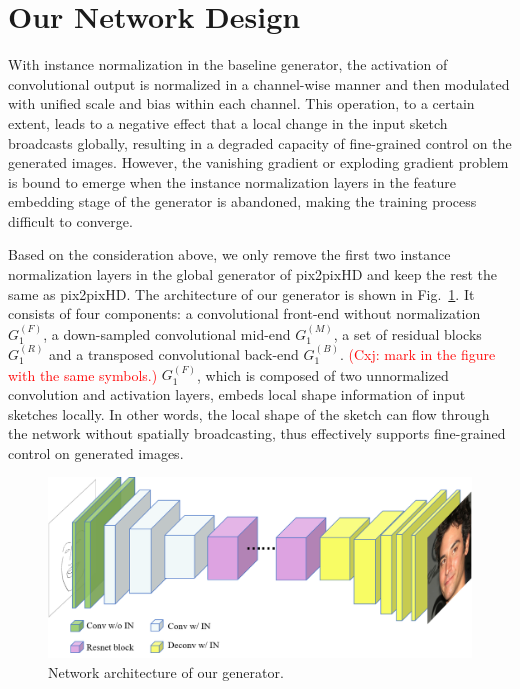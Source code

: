 \documentclass[10pt,twocolumn,letterpaper]{article}
\newcommand{\cxj}[1]{\textcolor{red}{(Cxj: #1)}}
\begin{document}
\section{Our Network Design}\label{sec:network}
%
With instance normalization in the baseline generator, the activation of convolutional output is normalized in a channel-wise manner and then modulated with unified scale and bias within each channel. 
This operation, to a certain extent, leads to a negative effect that a local change in the input sketch broadcasts globally, resulting in a degraded capacity of fine-grained control on the generated images.
However, the vanishing gradient or exploding gradient problem is bound to emerge when the instance normalization layers in the feature embedding stage of the generator is abandoned, making the training process difficult to converge. 
 
Based on the consideration above, we only remove the first two instance normalization layers in the global generator of pix2pixHD and keep the rest the same as pix2pixHD. 
The architecture of our generator is shown in Fig.~\ref{fig:our_generator}. 
It consists of four components: a convolutional front-end without normalization $G_1^{(F)}$, a down-sampled convolutional mid-end $G_1^{(M)}$, a set of residual blocks $G_1^{(R)}$ and a transposed convolutional back-end $G_1^{(B)}$. 
\cxj{mark in the figure with the same symbols.}
$G_1^{(F)}$, which is composed of two unnormalized convolution and activation layers,  embeds local shape information of input sketches locally.
In other words, the local shape of the sketch can flow through the network without spatially broadcasting, thus effectively supports fine-grained control on generated images. 

\begin{figure}[htbp]
	\centering
	\includegraphics[width=\columnwidth]{our_model_G.png}
	\caption{Network architecture of our generator. }
	\label{fig:our_generator}
\end{figure}
\end{document}

